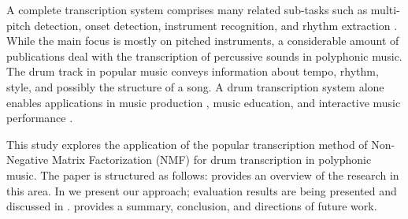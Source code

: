 \documentclass{article}
\begin{document}

A complete transcription system comprises many related sub-tasks such as multi-pitch detection, onset detection, instrument recognition, and rhythm extraction \cite{benetos_automatic_2013}. While the main focus is mostly on pitched instruments, a considerable amount of publications deal with the transcription of percussive sounds in polyphonic music. The drum track in popular music conveys information about tempo, rhythm, style, and possibly the structure of a song. A drum transcription system alone enables applications in music production \cite{yoshii_drumix:_2007}, music education, and interactive music performance \cite{weinberg_interactive_2009}.


This study explores the application of the popular transcription method of Non-Negative Matrix Factorization (NMF) for drum transcription in polyphonic music. The paper is structured as follows:  provides an overview of the research in this area. In  we present our approach; evaluation results are being presented and discussed in .  provides a summary, conclusion, and directions of future work.

\end{document}
